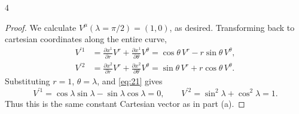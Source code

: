 \documentclass[11pt]{article}
\begin{document}
\begin{problem}{4}
\begin{enumerate}[label=(\alph*)]
\begin{proof}
We calculate \( V^{\mu}(\lambda = \pi/2) = (1,0) \), as desired.
Transforming back to cartesian coordinates along the entire curve,
\begin{equation}
\label{eq:22}
\begin{aligned}
 V^{\prime 1}&=\frac{\partial x^1}{\partial r}V^r+\frac{\partial x^1}{\partial\theta}V^\theta
 =\cos\theta\,V^r-r\sin\theta\,V^\theta,\\
 V^{\prime 2}&=\frac{\partial x^2}{\partial r}V^r+\frac{\partial x^2}{\partial\theta}V^\theta
 =\sin\theta\,V^r+r\cos\theta\,V^\theta.
\end{aligned}
\end{equation}
Substituting \(r=1\), \(\theta=\lambda\), and \cref{eq:21} gives
\begin{equation}
\label{eq:23}
V^{\prime1}=\cos\lambda\sin\lambda-\sin\lambda\cos\lambda=0,\qquad
V^{\prime2}=\sin^2\lambda+\cos^2\lambda=1.
\end{equation}
Thus this is the same constant Cartesian vector as in part (a).
\end{proof}
	\end{enumerate}
\end{problem}
\end{document}
